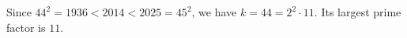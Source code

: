 Since $44^2=1936<2014<2025=45^2$, we have $k=44=2^2\cdot11$. Its largest prime factor is $\boxed{11}$.
